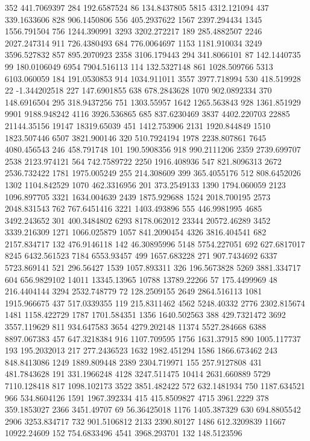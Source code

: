 352	441.7069397
284	192.6587524
86	134.8437805
5815	4312.121094
437	339.1633606
828	906.1450806
556	405.2937622
1567	2397.294434
1345	1556.791504
756	1244.390991
3293	3202.272217
189	285.4882507
2246	2027.247314
911	726.4380493
684	776.0064697
1153	1181.910034
3249	3596.527832
857	895.2070923
2358	3106.179443
294	341.8066101
87	142.1440735
99	180.0106049
6954	7904.516113
114	132.5327148
861	1028.509766
5313	6103.060059
184	191.0530853
914	1034.911011
3557	3977.718994
530	418.519928
22	-1.344202518
227	147.6901855
638	678.2843628
1070	902.0892334
370	148.6916504
295	318.9437256
751	1303.55957
1642	1265.563843
928	1361.851929
9901	9188.948242
4116	3926.536865
685	837.6230469
3837	4402.220703
22885	21144.35156
19147	18319.65039
451	1412.753906
2131	1920.844849
1510	1823.507446
6507	3821.900146
320	510.7924194
1978	2238.807861
7645	4080.456543
246	458.791748
101	190.5908356
918	990.2111206
2359	2739.699707
2538	2123.974121
564	742.7589722
2250	1916.408936
547	821.8096313
2672	2536.732422
1781	1975.005249
255	214.308609
399	365.4055176
512	808.6452026
1302	1104.842529
1070	462.3316956
201	373.2549133
1390	1794.060059
2123	1096.897705
3321	1634.004639
2439	1875.929688
1524	2018.700195
2573	2048.831543
762	767.6451416
3221	1403.493896
555	446.9981995
4685	3492.243652
301	400.3484802
6293	8178.062012
23344	20572.46289
3452	3339.216309
1271	1066.025879
1057	841.2090454
4326	3816.404541
682	2157.834717
132	476.9146118
142	46.30895996
5148	5754.227051
692	627.6817017
8245	6432.561523
7184	6553.93457
499	1657.683228
271	907.7434692
6337	5723.869141
521	296.56427
1539	1057.893311
326	196.5673828
5269	3881.334717
604	656.9829102
14011	13345.13965
10788	13789.22266
57	175.4499969
48	216.4404144
3294	2532.748779
72	128.2509155
2649	2864.516113
1081	1915.966675
437	517.0339355
119	215.8311462
4562	5248.40332
2776	2302.815674
1481	1158.422729
1787	1701.584351
1356	1640.502563
388	429.7321472
3692	3557.119629
811	934.647583
3654	4279.202148
11374	5527.284668
6388	8897.067383
457	647.3218384
916	1107.709595
1756	1631.37915
890	1005.117737
193	195.2032013
217	277.2436523
1632	1982.451294
1586	1866.673462
243	848.8413086
1249	1889.809448
2389	2304.719971
155	257.9127808
431	481.7843628
191	331.1966248
4128	3247.511475
10414	2631.660889
5729	7110.128418
817	1098.102173
3522	3851.482422
572	632.1481934
750	1187.634521
966	534.8604126
1591	1967.392334
415	415.8509827
4715	3961.2229
378	359.1853027
2366	3451.49707
69	56.36425018
1176	1405.387329
630	694.8805542
2906	3253.834717
732	901.5106812
2133	2390.80127
1486	612.3209839
11667	10922.24609
152	754.6833496
4541	3968.293701
132	148.5123596
